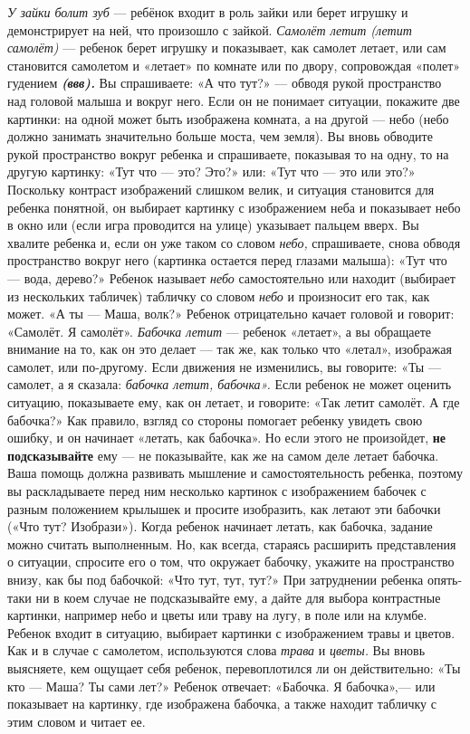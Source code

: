 \documentclass{book}
\renewcommand{\emph}[1]{\textit{#1}}
\begin{document}
\emph{У зайки болит зуб} --- ребёнок входит в роль зайки или берет
игрушку и демонстрирует на ней, что произошло с зайкой. \emph{Самолёт
летит (летит самолёт)} --- ребенок берет игрушку и показывает, как
самолет летает, или сам становится самолетом и «летает» по комнате или
по двору, сопровождая «полет» гудением \emph{\textbf{(ввв).}} Вы
спрашиваете: «А что тут?» --- обводя рукой пространство над головой
малыша и вокруг него. Если он не понимает ситуации, покажите две
картинки: на одной может быть изображена комната, а на другой --- небо
(небо должно занимать значительно больше моста, чем земля). Вы вновь
обводите рукой пространство вокруг ребенка и спрашиваете, показывая то
на одну, то на другую картинку: «Тут что --- это? Это?» или: «Тут что
--- это или это?» Поскольку контраст изображений слишком велик, и
ситуация становится для ребенка понятной, он выбирает картинку с
изображением неба и показывает небо в окно или (если игра проводится на
улице) указывает пальцем вверх. Вы хвалите ребенка и, если он уже таком
со словом \emph{небо,} спрашиваете, снова обводя пространство вокруг
него (картинка остается перед глазами малыша): «Тут что --- вода,
дерево?» Ребенок называет \emph{небо} самостоятельно или находит
(выбирает из нескольких табличек) табличку со словом \emph{небо} и
произносит его так, как может. «А ты --- Маша, волк?» Ребенок
отрицательно качает головой и говорит: «Самолёт. Я самолёт».
\emph{Бабочка летит} --- ребенок «летает», а вы обращаете внимание на
то, как он это делает --- так же, как только что «летал», изображая
самолет, или по-другому. Если движения не изменились, вы говорите: «Ты
--- самолет, а я сказала: \emph{бабочка летит, бабочка».} Если ребенок
не может оценить ситуацию, показываете ему, как он летает, и говорите:
«Так летит самолёт. А где бабочка?» Как правило, взгляд со стороны
помогает ребенку увидеть свою ошибку, и он начинает «летать, как
бабочка». Но если этого не произойдет, \textbf{не подсказывайте} ему ---
не показывайте, как же на самом деле летает бабочка. Ваша помощь должна
развивать мышление и самостоятельность ребенка, поэтому вы раскладываете
перед ним несколько картинок с изображением бабочек с разным положением
крылышек и просите изобразить, как летают эти бабочки («Что тут?
Изобрази»). Когда ребенок начинает летать, как бабочка, задание можно
считать выполненным. Но, как всегда, стараясь расширить представления о
ситуации, спросите его о том, что окружает бабочку, укажите на
пространство внизу, как бы под бабочкой: «Что тут, тут, тут?» При
затруднении ребенка опять-таки ни в коем случае не подсказывайте ему, а
дайте для выбора контрастные картинки, например небо и цветы или траву
на лугу, в поле или на клумбе. Ребенок входит в ситуацию, выбирает
картинки с изображением травы и цветов. Как и в случае с самолетом,
используются слова \emph{трава} и \emph{цветы.} Вы вновь выясняете, кем
ощущает себя ребенок, перевоплотился ли он действительно: «Ты кто ---
Маша? Ты сами лет?» Ребенок отвечает: «Бабочка. Я бабочка»,--- или
показывает на картинку, где изображена бабочка, а также находит табличку
с этим словом и читает ее.
\end{document}
